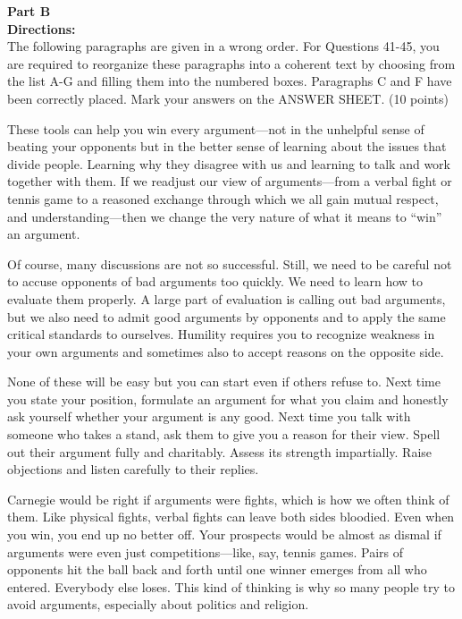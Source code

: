 \newpage

\noindent
\textbf{Part B}\\
\textbf{Directions:}\\
 The following paragraphs are given in a wrong order.
For Questions 41-45, you are required to reorganize these paragraphs
into a coherent text by choosing from the list A-G and filling them into
the numbered boxes. Paragraphs C and F have been correctly placed. Mark
your answers on the ANSWER SHEET. (10 points)


\begin{listmatch}
\item 
These tools can help you win every argument---not in the
unhelpful sense of beating your opponents but in the better sense of
learning about the issues that divide people. Learning why they disagree
with us and learning to talk and work together with them. If we readjust
our view of arguments---from a verbal fight or tennis game to a
reasoned exchange through which we all gain mutual respect, and
understanding---then we change the very nature of what it means to
``win'' an argument.


\item 
 Of course, many discussions are not so successful. Still, we need
to be careful not to accuse opponents of bad arguments too quickly. We
need to learn how to evaluate them properly. A large part of evaluation
is calling out bad arguments, but we also need to admit good arguments
by opponents and to apply the same critical standards to ourselves.
Humility requires you to recognize weakness in your own arguments and
sometimes also to accept reasons on the opposite side.


\item 
None of these will be easy but you can start even if others
refuse to. Next time you state your position, formulate an argument for
what you claim and honestly ask yourself whether your argument is any
good. Next time you talk with someone who takes a stand, ask them to
give you a reason for their view. Spell out their argument fully and
charitably. Assess its strength impartially. Raise objections and listen
carefully to their replies.


\item 
Carnegie would be right if arguments were fights, which is how we
often think of them. Like physical fights, verbal fights can leave both
sides bloodied. Even when you win, you end up no better off. Your
prospects would be almost as dismal if arguments were even just
competitions---like, say, tennis games. Pairs of opponents hit the ball back and forth until one winner emerges from
all who entered. Everybody else loses. This kind of thinking is why so
many people try to avoid arguments, especially about politics and
religion.



\end{listmatch}

